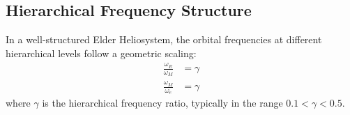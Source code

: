 \subsection{Hierarchical Frequency Structure}

\begin{theorem}
In a well-structured Elder Heliosystem, the orbital frequencies at different hierarchical levels follow a geometric scaling:
\begin{align}
\frac{\omega_E}{\omega_M} &= \gamma \\
\frac{\omega_M}{\omega_e} &= \gamma
\end{align}
where $\gamma$ is the hierarchical frequency ratio, typically in the range $0.1 < \gamma < 0.5$.
\end{theorem}

